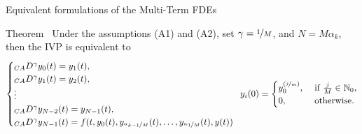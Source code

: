 \documentclass[aspectratio=169,xcolor=dvipsnames]{beamer}
\begin{document}
\begin{frame}{Equivalent formulations of the Multi-Term FDEs}

\begin{alertblock}{Theorem~\parencite[Theorem~8.1]{DiethelmBook}}
Under the assumptions \alert{(A1)} and \alert{(A2)}, set $\gamma = \nicefrac{1}{M}$, and $N = M \alpha_k$, then the IVP is equivalent to
\[
\begin{cases}
{}_{CA}D^{\gamma} y_0(t) = y_1(t),\\
{}_{CA}D^{\gamma} y_1(t) = y_2(t),\\
\vdots \\
{}_{CA}D^{\gamma} y_{N-2}(t) = y_{N-1}(t),\\
{}_{CA}D^{\gamma} y_{N-1}(t) = f(t,y_0(t),y_{\nicefrac{\alpha_{k-1}}{M}}(t),\ldots,y_{\nicefrac{\alpha_{1}}{M}}(t),y(t)) %
\end{cases} \hspace{-0.5em} y_i(0) = \begin{cases}
y_0^{(\nicefrac{j}{m})}, & \text{ if } \frac{j}{M} \in \mathbb{N}_0,\\
0, & \text{ otherwise}.
\end{cases}
\]
\end{alertblock}

\end{frame}
\end{document}
